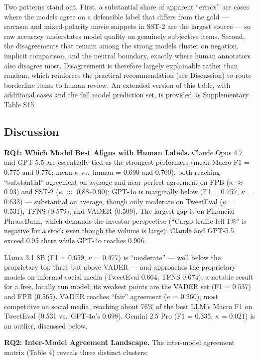 \documentclass[11pt]{article}
\begin{document}
Two patterns stand out. First, a substantial share of apparent
``errors'' are cases where the models agree on a defensible label that
differs from the gold --- sarcasm and mixed-polarity movie snippets in
SST-2 are the largest source --- so raw accuracy understates model
quality on genuinely subjective items. Second, the disagreements that
remain among the strong models cluster on negation, implicit comparison,
and the neutral boundary, exactly where human annotators also disagree
most. Disagreement is therefore largely explainable rather than random,
which reinforces the practical recommendation (see Discussion) to route
borderline items to human review. An extended version of this table,
with additional cases and the full model prediction set, is provided as
Supplementary Table S15.

\subsection{Discussion}\label{discussion}

\textbf{RQ1: Which Model Best Aligns with Human Labels.} Claude Opus 4.7
and GPT-5.5 are essentially tied as the strongest performers (mean Macro
F1 = 0.775 and 0.776; mean $\kappa$ vs.~human = 0.690 and 0.700), both reaching
``substantial'' agreement on average and near-perfect agreement on FPB
($\kappa$ $\approx$ 0.93) and SST-2 ($\kappa$ $\approx$ 0.88--0.90); GPT-4o is marginally below (F1 =
0.757, $\kappa$ = 0.633) --- substantial on average, though only moderate on
TweetEval ($\kappa$ = 0.531), TFNS (0.579), and VADER (0.509). The largest gap
is on Financial PhraseBank, which demands the investor perspective
(``Cargo traffic fell 1\%'' is negative for a stock even though the
volume is large): Claude and GPT-5.5 exceed 0.95 there while GPT-4o
reaches 0.906.

Llama 3.1 8B (F1 = 0.659, $\kappa$ = 0.477) is ``moderate'' --- well below the
proprietary top three but above VADER --- and approaches the proprietary
models on informal social media (TweetEval 0.664, TFNS 0.674), a notable
result for a free, locally run model; its weakest points are the VADER
set (F1 = 0.537) and FPB (0.565). VADER reaches ``fair'' agreement ($\kappa$ =
0.260), most competitive on social media, reaching about 76\% of the
best LLM's Macro F1 on TweetEval (0.531 vs.~GPT-4o's 0.698). Gemini 2.5
Pro (F1 = 0.335, $\kappa$ = 0.021) is an outlier, discussed below.

\textbf{RQ2: Inter-Model Agreement Landscape.} The inter-model agreement
matrix (Table 4) reveals three distinct clusters:
\end{document}
